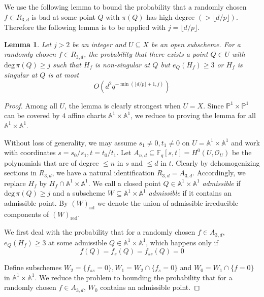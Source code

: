 \documentclass[12pt]{article}
\theoremstyle{plain}
\newtheorem{lemma}[equation]{Lemma}
\theoremstyle{definition}
\newcommand{\IA}{\mathbb{A}}
\newcommand{\IF}{\mathbb{F}}
\newcommand{\IP}{\mathbb{P}}
\newcommand{\sO}{\mathcal{O}}
\renewcommand{\deg}{\mathrm{deg}\,}
\newcommand{\<}{\langle}
\renewcommand{\>}{\rangle}
\begin{document}
We use the following lemma to bound the probability that a randomly chosen $f \in R_{3, d}$ is bad at some point $Q$ with $\pi(Q)$ has high degree $(> \lfloor d/p \rfloor)$. Therefore the following lemma is to be applied with $j = \lfloor d/p \rfloor$. 
\begin{lemma}
\label{prep}
Let $j > 2$ be an integer and $U \subseteq X$ be an open subscheme. For a randomly chosen $f \in R_{3, d}$, the probability that there exists a point $Q \in U$ with $\deg \pi(Q) \ge j$ such that $H_f$ is non-singular at $Q$ but $e_{Q}(H_f) \ge 3$ or $H_f$ is singular at $Q$ is at most 
$$ O(d^2 q^{- \min(\lfloor d/p \rfloor + 1, j)}) $$
\end{lemma}
\begin{proof}
Among all $U$, the lemma is clearly strongest when $U = X$. Since $\IP^1 \times \IP^1$ can be covered by $4$ affine charts $\IA^1 \times \IA^1$, we reduce to proving the lemma for all $\IA^1 \times \IA^1$.  

Without loss of generality, we may assume $s_1 \neq 0, t_1 \neq 0$ on $U = \IA^1 \times \IA^1$ and work with coordinates $s = s_0/s_1, t = t_0/t_1$. Let $A_{n, d} \subseteq \IF_q[s, t] = H^0(U, \sO_U)$ be the polynomials that are of degree $\le n$ in $s$ and $\le d$ in $t$. Clearly by dehomogenizing sections in $R_{3, d}$, we have a natural identification $R_{3, d} = A_{3, d}$. Accordingly, we replace $H_f$ by $H_f \cap \IA^1 \times \IA^1$. We call a closed point $Q \in \IA^1 \times \IA^1$ \textit{admissible} if $\deg \pi(Q) \ge j$ and a subscheme $W \subseteq \IA^1 \times \IA^1$ \textit{admissible} if it contains an admissible point. By $(W)_{\mathrm{ad}}$ we denote the union of admissible irreducible components of $(W)_{\mathrm{red}}$. 

We first deal with the probability that for a randomly chosen $f \in A_{3, d}$, $e_Q(H_f) \ge 3$ at some admissible $Q \in \IA^1 \times \IA^1$, which happens only if \begin{equation} \label{ramify} f(Q) = f_s(Q) = f_{ss}(Q) = 0 \end{equation}  

Define subschemes $W_2 = \{f_{ss} = 0 \}, W_1 = W_2 \cap \{ f_s = 0 \}$ and $W_0 = W_1 \cap \{ f = 0 \}$ in $\IA^1 \times \IA^1$. We reduce the problem to bounding the probability that for a randomly chosen $f \in A_{3, d}$, $W_0$ contains an admissible point.  


\end{proof}
\end{document}
